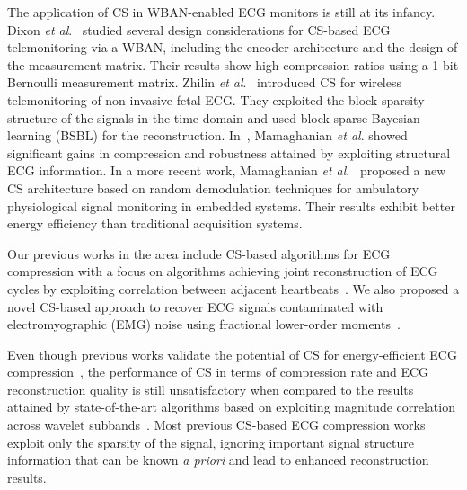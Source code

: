 \documentclass[journal]{IEEEtran}
\begin{document}
The application of CS in WBAN-enabled ECG monitors is still at its infancy. Dixon \textit{et al}.~\cite{Dixo12} studied several design considerations for  CS-based ECG telemonitoring via a WBAN, including the encoder architecture and the design of the measurement matrix. Their results show high compression ratios using a 1-bit Bernoulli measurement matrix. Zhilin \textit{et al}.~\cite{Zhan13} introduced CS for wireless telemonitoring of non-invasive fetal ECG. They exploited the block-sparsity structure of the signals in the time domain and used block sparse Bayesian learning (BSBL) for the reconstruction. In~\cite{Mama11a}, Mamaghanian \textit{et al}. showed significant gains in compression and robustness attained by exploiting structural ECG information. In a more recent work, Mamaghanian \textit{et al}.~\cite{Mama12} proposed a new CS architecture based on random demodulation techniques for ambulatory physiological signal monitoring in embedded systems. Their results exhibit better energy efficiency than traditional acquisition systems.

Our previous works in the area include CS-based algorithms for ECG compression with a focus on algorithms achieving joint reconstruction of ECG cycles by exploiting correlation between adjacent heartbeats~\cite{Pola11,Pola12,Pola12b}. We also proposed a novel CS-based approach to recover ECG signals contaminated with electromyographic (EMG) noise using fractional lower-order moments~\cite{Pola12a}.

Even though previous works validate the potential of CS  for  energy-efficient ECG compression~\cite{Mama11,Dixo12,Zhan13}, the performance of CS in terms of compression rate and ECG reconstruction quality is still unsatisfactory when compared to the results attained by state-of-the-art algorithms based on exploiting magnitude correlation across wavelet subbands~\cite{Hilt97,Zhita00}. Most previous CS-based ECG compression works exploit only the sparsity of the signal, ignoring important signal structure information that can be known \textit{a priori} and lead to enhanced reconstruction results.
\end{document}
